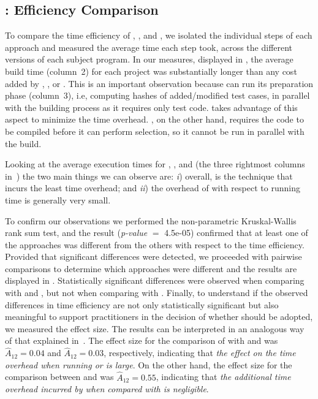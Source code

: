 \subsection{: Efficiency Comparison}
\label{subsec:rq3}
To compare the time efficiency of \ek, \fs, and \fz, 
we isolated the individual steps of each approach and measured the average time each step took, across the different versions of each subject program. 
In our measures, displayed in , 
the average build time (column~2) for each project was substantially longer than any cost added by \ek, \fs, or \fz.
This is an important observation because \fs can run its preparation phase (column~3), i.e, computing hashes of added/modified test cases, in parallel with the building process as it requires only test code.
\fz takes advantage of this aspect to minimize the time overhead. %
\ek, on the other hand, requires the code to be compiled before it can perform selection, so it cannot be run in parallel with the build.





Looking at the average execution times for \fs, \ek, and \fz 
(the three rightmost columns in~) 
the two main things we can observe are: 
\textit{i}) overall, \fs is the technique that incurs the least time overhead;
and \textit{ii}) the overhead of \fz with respect to \ek running time is generally very small.

To confirm our observations we performed the non-parametric Kruskal-Wallis rank sum test, 
and the result (\textit{p-value} $=$ 4.5e-05) confirmed that at least one of the approaches was different from the others with respect to the time efficiency.
Provided that significant differences were detected, we proceeded with pairwise comparisons to determine which approaches were different
and the results are displayed in .
Statistically significant differences were observed when comparing \fs with \ek and \fz, but not when comparing \fz with \ek.
Finally, to understand if the observed differences in time efficiency are not only statistically significant but also meaningful to support practitioners in the decision of whether \fz should be adopted, we measured the effect size.
The results can be interpreted in an analogous way of that explained in~.
The effect size for the comparison of \fs with \ek and \fz was $\hat{A}_{12}=0.04$ and $\hat{A}_{12}=0.03$, respectively, indicating that \emph{the effect on the time overhead when running \ek or \fz is large}.
On the other hand, the effect size for the comparison between \fz and \ek was $\hat{A}_{12}=0.55$, indicating that \emph{the additional time overhead incurred by \fz when compared with \ek is negligible}.

